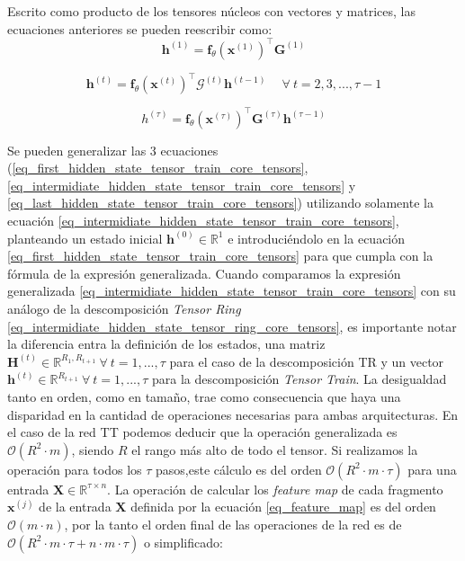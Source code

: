 \documentclass[spanish]{article}
\theoremstyle{definition}
\theoremstyle{remark}
\numberwithin{equation}{section}
\numberwithin{equation}{section} %
\begin{document}
Escrito como producto de los tensores núcleos con vectores y matrices, las ecuaciones anteriores se pueden reescribir como:
\begin{equation}
\label{eq_first_hidden_state_tensor_train_core_tensors}
\boldsymbol{h}^{(1)}=\boldsymbol{f}_\theta(\boldsymbol{x}^{(1)})^\intercal \boldsymbol{G}^{(1)} 
\end{equation} \par
\begin{equation}
\label{eq_intermidiate_hidden_state_tensor_train_core_tensors}
\boldsymbol{h}^{(t)}  = \boldsymbol{f}_\theta(\boldsymbol{x}^{(t)})^\intercal \mathcal{G}^{(t)}  \boldsymbol{h}^{(t-1)} \ \quad \forall \ t=2,3,...,\tau-1
\end{equation} \par
\begin{equation}
\label{eq_last_hidden_state_tensor_train_core_tensors}
h^{(\tau)}  = \boldsymbol{f}_\theta(\boldsymbol{x}^{(\tau)})^\intercal \boldsymbol{G}^{(\tau)}  \boldsymbol{h}^{(\tau-1)} 
\end{equation} \par
Se pueden generalizar las 3 ecuaciones (\eqref{eq_first_hidden_state_tensor_train_core_tensors}, \eqref{eq_intermidiate_hidden_state_tensor_train_core_tensors} y \eqref{eq_last_hidden_state_tensor_train_core_tensors}) utilizando solamente la ecuación \eqref{eq_intermidiate_hidden_state_tensor_train_core_tensors}, planteando un estado inicial $\boldsymbol{h}^{(0)} \in \mathbb{R}^{1}$ e introduciéndolo en la ecuación \eqref{eq_first_hidden_state_tensor_train_core_tensors} para que cumpla con la fórmula de la expresión generalizada. Cuando comparamos la expresión generalizada \eqref{eq_intermidiate_hidden_state_tensor_train_core_tensors} con su análogo de la descomposición \textit{Tensor Ring} \eqref{eq_intermidiate_hidden_state_tensor_ring_core_tensors}, es importante notar la diferencia entra la definición de los estados, una matriz $\boldsymbol{H}^{(t)} \in \mathbb{R}^{R_1,R_{t+1}} \ \forall \ t=1,...,\tau$ para el caso de la descomposición TR y un vector $\boldsymbol{h}^{(t)} \in \mathbb{R}^{R_{t+1}} \ \forall \ t=1,...,\tau$ para la descomposición \textit{Tensor Train}. La desigualdad tanto en orden, como en tamaño, trae como consecuencia que haya una disparidad en la cantidad de operaciones necesarias para ambas arquitecturas. En el caso de la red TT podemos deducir que la operación generalizada es $\mathcal{O}(R^2 \cdot m )$, siendo $R$ el rango más alto de todo el tensor. Si realizamos la operación para todos los $\tau$ pasos,este cálculo es del orden $\mathcal{O}(R^2 \cdot m \cdot \tau)$ para una entrada $\boldsymbol{X} \in \mathbb{R}^{\tau \times n}$. La operación de calcular los \textit{feature map} de cada fragmento $\boldsymbol{x}^{(j)}$ de la entrada $\boldsymbol{X}$ definida por la ecuación \eqref{eq_feature_map} es del orden $\mathcal{O}(m \cdot n)$, por la tanto el orden final de las operaciones de la red es de $\mathcal{O}(R^2 \cdot m \cdot \tau + n \cdot m \cdot \tau)$ o simplificado:
\end{document}
